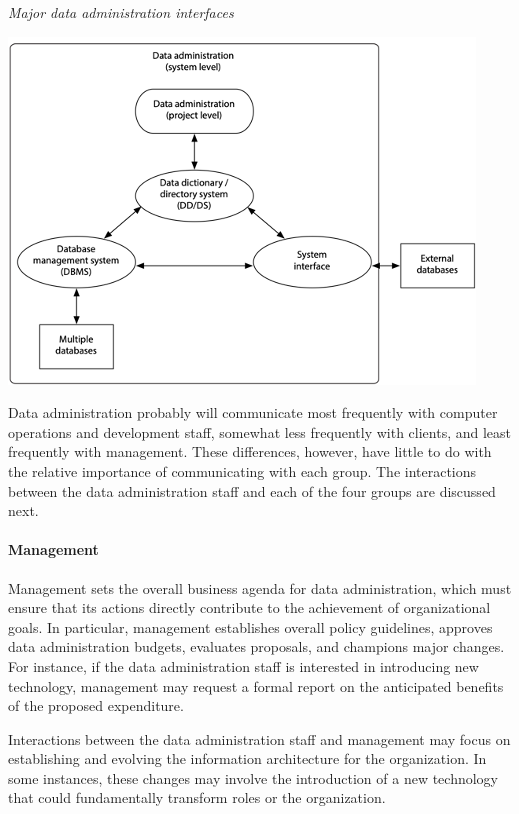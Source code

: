 \documentclass[
]{article}
\begin{document}
\emph{Major data administration interfaces}

\includegraphics{Figures/Chapter 24/data-interfaces.png}

Data administration probably will communicate most frequently with
computer operations and development staff, somewhat less frequently with
clients, and least frequently with management. These differences,
however, have little to do with the relative importance of communicating
with each group. The interactions between the data administration staff
and each of the four groups are discussed next.

\hypertarget{management}{%
\paragraph*{Management}\label{management}}

Management sets the overall business agenda for data administration,
which must ensure that its actions directly contribute to the
achievement of organizational goals. In particular, management
establishes overall policy guidelines, approves data administration
budgets, evaluates proposals, and champions major changes. For instance,
if the data administration staff is interested in introducing new
technology, management may request a formal report on the anticipated
benefits of the proposed expenditure.

Interactions between the data administration staff and management may
focus on establishing and evolving the information architecture for the
organization. In some instances, these changes may involve the
introduction of a new technology that could fundamentally transform
roles or the organization.
\end{document}
